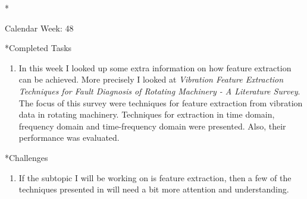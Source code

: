 \documentclass[11pt,a4paper]{article}
\begin{document}
\newpage
\begin{section}*{Calendar Week: 48 \hfill \date{27 November, 2020}}
 \begin{refsection}

       \begin{subsection}*{Completed Tasks}
             \begin{enumerate}
                   \item
                         In this week I looked up some extra information on how feature extraction can be achieved. More precisely I
                         looked at \emph{Vibration Feature Extraction Techniques for Fault Diagnosis of Rotating Machinery -
                               A Literature Survey}. The focus of this survey were techniques for feature extraction from vibration data
                         in rotating machinery. Techniques for extraction in time domain, frequency domain and time-frequency
                         domain were presented. Also, their performance was evaluated. \cite{survey5}
             \end{enumerate}
       \end{subsection}

       \begin{subsection}*{Challenges}
             \begin{enumerate}
                   \item
                         If the subtopic I will be working on is feature extraction, then a few of the techniques presented
                         in \cite{survey5} will need a bit more attention and understanding.
             \end{enumerate}
       \end{subsection}

       \printbibliography
 \end{refsection}
\end{section}
\end{document}
